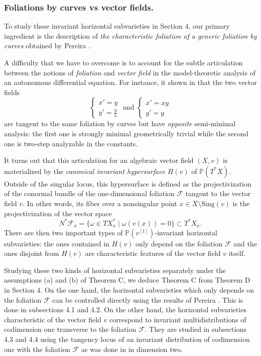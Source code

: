 \documentclass[12pt]{amsart}
\renewcommand{\P}{\mathbb{P}}
\theoremstyle{definition}
\theoremstyle{plain}
\theoremstyle{exampstyle}
\theoremstyle{exampstyle}\newtheorem{thmxbis}{Theorem}
\numberwithin{equation}{section}
\theoremstyle{remark}
\begin{document}
\subsubsection*{Foliations by curves vs vector fields.} To study these invariant horizontal subvarieties in Section 4, our primary ingredient is the description of {\em the characteristic foliation of a generic foliation by curves} obtained by Pereira \cite{Pereira-JEMS}.  

A difficulty that we have to overcome  is to account for the subtle articulation between the notions of {\em foliation} and {\em vector field} in the model-theoretic analysis of an autonomous differential equation. For instance, it shown in \citep[Example 4.14]{FJMN} that the two vector fields 
$$ \begin{cases} 
x' = y \\
y' = \frac y x \end{cases} \text{ and } \begin{cases} x' = xy \\
y' = y \end{cases} $$
are tangent to the same foliation by curves but have {\em opposite} semi-minimal analysis: the first one is strongly minimal geometrically trivial while the second one is two-step analyzable in the constants.

It turns out that this articulation for an algebraic vector field $(X,v)$ is materialized by the {\em canonical invariant hypersurface $H(v)$} of $\P(T^\ast X)$.  Outside of the singular locus, this hypersurface is defined as the projectivization of the conormal bundle of the one-dimensional foliation $\mathcal F$ tangent to the vector field $v$. In other words, its fiber over a nonsingular  point $x \in X \setminus \mathrm{Sing}(v)$ is the projectivization of the vector space 
$$ N^\ast\mathcal F_x = \lbrace \omega \in TX^\ast_x \mid \omega(v(x)) = 0 \rbrace \subset T^\ast X_x.$$  
There are then two important types of $\P(v^{[1]})$-invariant horizontal subvarieties: the ones contained in $H(v)$ only depend on the foliation $\mathcal F$ and the ones disjoint from $H(v)$ are characteristic features of the vector field $v$ itself.


Studying these two kinds of horizontal subvarieties separately  under the assumptions (a) and (b) of Theorem C, we deduce Theorem C from Theorem D in Section 4. On the one hand, the horizontal subvarieties which only depends on the foliation $\mathcal F$ can be controlled directly using the results of Pereira \cite{Pereira-JEMS}. This is done in subsections 4.1 and 4.2. On the other hand, the horizontal subvarieties  characteristic of the vector field $v$ correspond to invariant multidistributions of codimension one transverse to the foliation $\mathcal F$. They are studied in subsections 4.3 and 4.4 using the tangency locus of an invariant distribution of codimension one with the foliation $\mathcal F$ as was done in \cite{jaoui-ANT} in dimension two.
\end{document}

